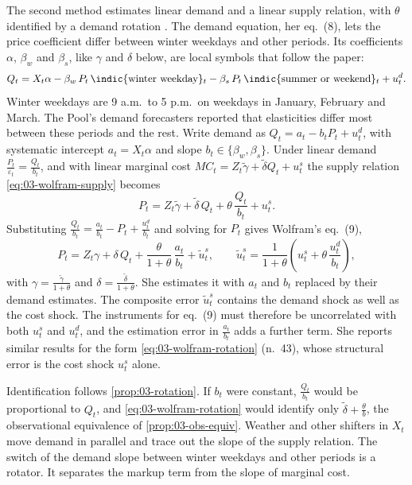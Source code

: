 The second method estimates linear demand and a linear supply relation, with $\theta$ identified by a demand rotation
\citep[pp.~820--821]{Wolfram1999}. The demand equation, her eq.~(8), lets the price coefficient differ between winter
weekdays and other periods. Its coefficients $\alpha$, $\beta_w$ and $\beta_s$, like $\gamma$ and $\delta$ below, are
local symbols that follow the paper:
\begin{equation}\label{eq:03-wolfram-demand}
Q_t = X_t\alpha - \beta_w\, P_t\, \indic\{\text{winter weekday}\}_t - \beta_s\, P_t\,
\indic\{\text{summer or weekend}\}_t + u^d_t.
\end{equation}
Winter weekdays are 9 a.m.\ to 5 p.m.\ on weekdays in January, February and March. The Pool's demand forecasters
reported that elasticities differ most between these periods and the rest. Write demand as $Q_t = a_t - b_t P_t +
u^d_t$, with systematic intercept $a_t = X_t\alpha$ and slope $b_t \in \{\beta_w, \beta_s\}$. Under linear demand $\frac{P_t}{\varepsilon_t} =
\frac{Q_t}{b_t}$, and with linear marginal cost $MC_t = Z_t\tilde\gamma + \tilde\delta Q_t + u^s_t$ the supply relation
\eqref{eq:03-wolfram-supply} becomes
\begin{equation}\label{eq:03-wolfram-rotation}
P_t = Z_t\tilde\gamma + \tilde\delta\, Q_t + \theta\,\frac{Q_t}{b_t} + u^s_t.
\end{equation}
Substituting $\frac{Q_t}{b_t} = \frac{a_t}{b_t} - P_t + \frac{u^d_t}{b_t}$ and solving for $P_t$ gives Wolfram's
eq.~(9),
\begin{equation*}
P_t = Z_t\gamma + \delta\, Q_t + \frac{\theta}{1 + \theta}\,\frac{a_t}{b_t} + \tilde u^s_t,
\qquad \tilde u^s_t = \frac{1}{1 + \theta}\left(u^s_t + \theta\,\frac{u^d_t}{b_t}\right),
\end{equation*}
with $\gamma = \frac{\tilde\gamma}{1 + \theta}$ and $\delta = \frac{\tilde\delta}{1 + \theta}$. She estimates it with
$a_t$ and $b_t$ replaced by their demand estimates. The composite error $\tilde u^s_t$ contains the demand shock as
well as the cost shock. The instruments for eq.~(9) must therefore be uncorrelated with both
$u^s_t$ and $u^d_t$, and the estimation error in $\frac{a_t}{b_t}$ adds a further term. She reports similar results
for the form \eqref{eq:03-wolfram-rotation} (n.~43), whose structural error is the cost shock $u^s_t$ alone.

Identification follows \cref{prop:03-rotation}. If $b_t$ were constant, $\frac{Q_t}{b_t}$ would be proportional to
$Q_t$, and \eqref{eq:03-wolfram-rotation} would identify only $\tilde\delta + \frac{\theta}{b}$, the observational
equivalence of \cref{prop:03-obs-equiv}. Weather and other shifters in $X_t$ move demand in parallel and trace out the
slope of the supply relation. The switch of the demand slope between winter weekdays and other periods is a rotator.
It separates the markup term from the slope of marginal cost.

